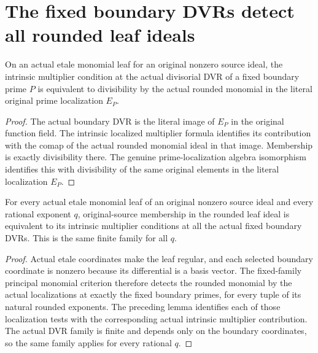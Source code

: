 \section{The fixed boundary DVRs detect all rounded leaf ideals}

\begin{lemma}\label{lem:sc0-boundary-multiplier-localization-test}
\leanok
{}
On an actual etale monomial leaf for an original nonzero source ideal,
the intrinsic multiplier condition at the actual divisorial DVR of a
fixed boundary prime $P$ is equivalent to divisibility by the actual
rounded monomial in the literal original prime localization $E_P$.
\end{lemma}
\begin{proof}
The actual boundary DVR is the literal image of $E_P$ in the original
function field. The intrinsic localized multiplier formula identifies
its contribution with the comap of the actual rounded monomial ideal
in that image. Membership is exactly divisibility there. The genuine
prime-localization algebra isomorphism identifies this with divisibility
of the same original elements in the literal localization $E_P$.
\end{proof}

\begin{theorem}\label{thm:sc0-fixed-boundary-multiplier-detection}
\leanok
{}
For every actual etale monomial leaf of an original nonzero source
ideal and every rational exponent $q$, original-source membership in
the rounded leaf ideal is equivalent to its intrinsic multiplier
conditions at all the actual fixed boundary DVRs. This is the same
finite family for all $q$.
\end{theorem}
\begin{proof}
Actual etale coordinates make the leaf regular, and each selected
boundary coordinate is nonzero because its differential is a basis
vector. The fixed-family principal monomial criterion therefore detects
the rounded monomial by the actual localizations at exactly the fixed
boundary primes, for every tuple of its natural rounded exponents.
The preceding lemma identifies each of those localization tests with
the corresponding actual intrinsic multiplier contribution. The actual
DVR family is finite and depends only on the boundary coordinates, so
the same family applies for every rational $q$.
\end{proof}
